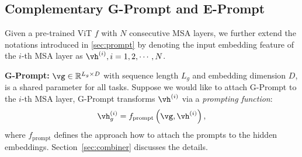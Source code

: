 \documentclass[runningheads]{llncs}
\newcommand{\zizhaoz}[1]{\textcolor{green}{Zizhao: #1}}
\newcommand{\gprompt}{G-Prompt\xspace}
\newcommand{\eprompt}{E-Prompt\xspace}
\newcommand{\eg}{\emph{e.g.}\xspace}
\def\pfunc{{f_{\text{prompt}}}}
\begin{document}
\subsection{Complementary G-Prompt and E-Prompt} \label{sec:g-e-prompt}
Given a pre-trained ViT $f$ with $N$ consecutive MSA layers, we further extend the notations introduced in \ref{sec:prompt} by denoting the input embedding feature of the $i$-th MSA layer as $\vh^{(i)}, i = 1, 2, \cdots, N$.


\textbf{\gprompt:} $\vg \in \mathbb{R}^{L_g \times D}$ with sequence length $L_g$ and embedding dimension $D$, is a shared parameter for all tasks. Suppose we would like to attach \gprompt to the $i$-th MSA layer, 
\gprompt transforms $\vh^{(i)}$ via a \emph{prompting function}:
\begin{equation} \label{eq:gprompt}
    \vh_g^{(i)} = \pfunc \left(\vg, \vh^{(i)}\right),
\end{equation}
where $\pfunc$ defines the approach how to attach the prompts to the hidden embeddings. %
 Section~\ref{sec:combiner} discusses the details.
\end{document}
